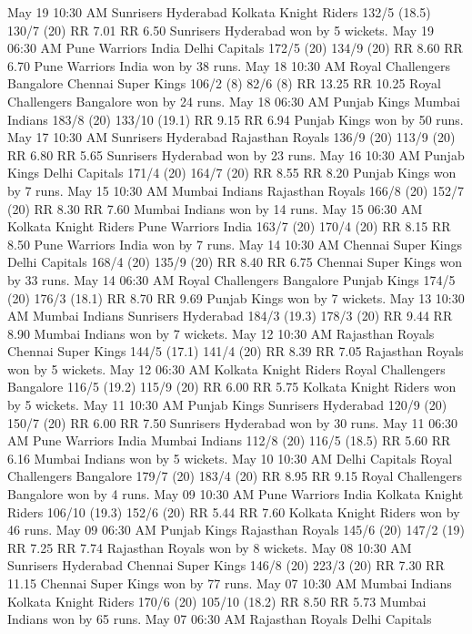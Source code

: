 May 19
10:30 AM
Sunrisers Hyderabad
Kolkata Knight Riders
132/5 (18.5)
130/7 (20)
RR 7.01
RR 6.50
Sunrisers Hyderabad won by 5 wickets.
May 19
06:30 AM
Pune Warriors India
Delhi Capitals
172/5 (20)
134/9 (20)
RR 8.60
RR 6.70
Pune Warriors India won by 38 runs.
May 18
10:30 AM
Royal Challengers Bangalore
Chennai Super Kings
106/2 (8)
82/6 (8)
RR 13.25
RR 10.25
Royal Challengers Bangalore won by 24 runs.
May 18
06:30 AM
Punjab Kings
Mumbai Indians
183/8 (20)
133/10 (19.1)
RR 9.15
RR 6.94
Punjab Kings won by 50 runs.
May 17
10:30 AM
Sunrisers Hyderabad
Rajasthan Royals
136/9 (20)
113/9 (20)
RR 6.80
RR 5.65
Sunrisers Hyderabad won by 23 runs.
May 16
10:30 AM
Punjab Kings
Delhi Capitals
171/4 (20)
164/7 (20)
RR 8.55
RR 8.20
Punjab Kings won by 7 runs.
May 15
10:30 AM
Mumbai Indians
Rajasthan Royals
166/8 (20)
152/7 (20)
RR 8.30
RR 7.60
Mumbai Indians won by 14 runs.
May 15
06:30 AM
Kolkata Knight Riders
Pune Warriors India
163/7 (20)
170/4 (20)
RR 8.15
RR 8.50
Pune Warriors India won by 7 runs.
May 14
10:30 AM
Chennai Super Kings
Delhi Capitals
168/4 (20)
135/9 (20)
RR 8.40
RR 6.75
Chennai Super Kings won by 33 runs.
May 14
06:30 AM
Royal Challengers Bangalore
Punjab Kings
174/5 (20)
176/3 (18.1)
RR 8.70
RR 9.69
Punjab Kings won by 7 wickets.
May 13
10:30 AM
Mumbai Indians
Sunrisers Hyderabad
184/3 (19.3)
178/3 (20)
RR 9.44
RR 8.90
Mumbai Indians won by 7 wickets.
May 12
10:30 AM
Rajasthan Royals
Chennai Super Kings
144/5 (17.1)
141/4 (20)
RR 8.39
RR 7.05
Rajasthan Royals won by 5 wickets.
May 12
06:30 AM
Kolkata Knight Riders
Royal Challengers Bangalore
116/5 (19.2)
115/9 (20)
RR 6.00
RR 5.75
Kolkata Knight Riders won by 5 wickets.
May 11
10:30 AM
Punjab Kings
Sunrisers Hyderabad
120/9 (20)
150/7 (20)
RR 6.00
RR 7.50
Sunrisers Hyderabad won by 30 runs.
May 11
06:30 AM
Pune Warriors India
Mumbai Indians
112/8 (20)
116/5 (18.5)
RR 5.60
RR 6.16
Mumbai Indians won by 5 wickets.
May 10
10:30 AM
Delhi Capitals
Royal Challengers Bangalore
179/7 (20)
183/4 (20)
RR 8.95
RR 9.15
Royal Challengers Bangalore won by 4 runs.
May 09
10:30 AM
Pune Warriors India
Kolkata Knight Riders
106/10 (19.3)
152/6 (20)
RR 5.44
RR 7.60
Kolkata Knight Riders won by 46 runs.
May 09
06:30 AM
Punjab Kings
Rajasthan Royals
145/6 (20)
147/2 (19)
RR 7.25
RR 7.74
Rajasthan Royals won by 8 wickets.
May 08
10:30 AM
Sunrisers Hyderabad
Chennai Super Kings
146/8 (20)
223/3 (20)
RR 7.30
RR 11.15
Chennai Super Kings won by 77 runs.
May 07
10:30 AM
Mumbai Indians
Kolkata Knight Riders
170/6 (20)
105/10 (18.2)
RR 8.50
RR 5.73
Mumbai Indians won by 65 runs.
May 07
06:30 AM
Rajasthan Royals
Delhi Capitals

